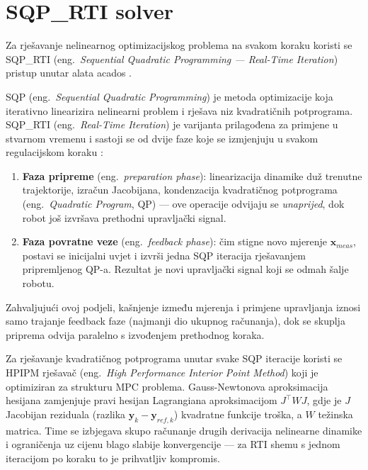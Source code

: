 \section{SQP\_RTI solver}

Za rješavanje nelinearnog optimizacijskog problema na svakom koraku koristi se SQP\_RTI (eng.\ \textit{Sequential Quadratic Programming --- Real-Time Iteration}) pristup unutar alata acados \cite{verschueren2022acados, acados_docs, diehl2002rti}.

SQP (eng.\ \textit{Sequential Quadratic Programming}) je metoda optimizacije koja iterativno linearizira nelinearni problem i rješava niz kvadratičnih potprograma. SQP\_RTI (eng.\ \textit{Real-Time Iteration}) je varijanta prilagođena za primjene u stvarnom vremenu i sastoji se od dvije faze koje se izmjenjuju u svakom regulacijskom koraku \cite{diehl2002rti}:

\begin{enumerate}
  \item \textbf{Faza pripreme} (eng.\ \textit{preparation phase}): linearizacija dinamike duž trenutne trajektorije, izračun Jacobijana, kondenzacija kvadratičnog potprograma (eng.\ \textit{Quadratic Program}, QP) --- ove operacije odvijaju se \textit{unaprijed}, dok robot još izvršava prethodni upravljački signal.
  \item \textbf{Faza povratne veze} (eng.\ \textit{feedback phase}): čim stigne novo mjerenje $\mathbf{x}_{meas}$, postavi se inicijalni uvjet i izvrši jedna SQP iteracija rješavanjem pripremljenog QP-a. Rezultat je novi upravljački signal koji se odmah šalje robotu.
\end{enumerate}

Zahvaljujući ovoj podjeli, kašnjenje između mjerenja i primjene upravljanja iznosi samo trajanje feedback faze (najmanji dio ukupnog računanja), dok se skuplja priprema odvija paralelno s izvođenjem prethodnog koraka.

Za rješavanje kvadratičnog potprograma unutar svake SQP iteracije koristi se HPIPM rješavač (eng.\ \textit{High Performance Interior Point Method}) koji je optimiziran za strukturu MPC problema. Gauss-Newtonova aproksimacija hesijana zamjenjuje pravi hesijan Lagrangiana aproksimacijom $J^\top W J$, gdje je $J$ Jacobijan reziduala (razlika $\mathbf{y}_k - \mathbf{y}_{ref,k}$) kvadratne funkcije troška, a $W$ težinska matrica. Time se izbjegava skupo računanje drugih derivacija nelinearne dinamike i ograničenja uz cijenu blago slabije konvergencije --- za RTI shemu s jednom iteracijom po koraku to je prihvatljiv kompromis.

